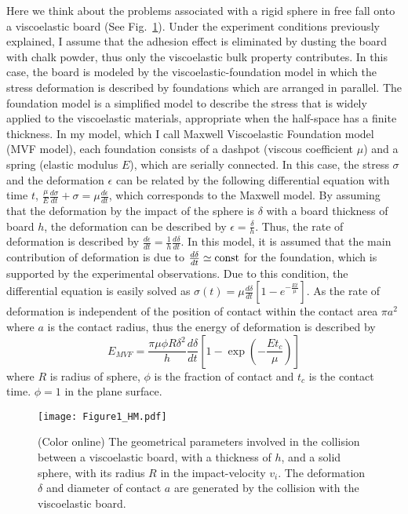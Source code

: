 \documentclass[default,iicol,10pt]{sn-jnl}%
\theoremstyle{thmstyleone}%
\theoremstyle{thmstyletwo}%
\theoremstyle{thmstylethree}%
\begin{document}
Here we think about the problems associated with a rigid sphere in free fall onto a viscoelastic board (See Fig.~\ref{fig:F1}). Under the experiment conditions previously explained, I assume that the adhesion effect is eliminated by dusting the board with chalk powder, thus only the viscoelastic bulk property contributes. In this case, the board is modeled by the viscoelastic-foundation model in which the stress deformation is described by foundations which are arranged in parallel\cite{Foundation}. The foundation model is a simplified model to describe the stress that is widely applied to the viscoelastic materials, appropriate when the half-space has a finite thickness. In my model, which I call Maxwell Viscoelastic Foundation model (MVF model), each foundation consists of a dashpot (viscous coefficient $\mu$) and a spring (elastic modulus $E$), which are serially connected. In this case, the stress $\sigma$ and the deformation $\epsilon$ can be related by the following differential equation with time $t$, $\frac{\mu}{E}\frac{d \sigma}{dt} + \sigma = \mu \frac{d \epsilon}{dt}$, which corresponds to the Maxwell model. By assuming that the deformation by the impact of the sphere is $\delta$ with a board thickness of board $h$, the deformation can be described by $\epsilon = \frac{\delta}{h}$. Thus, the rate of deformation is described by $\frac{d \epsilon}{dt} = \frac{1}{h}\frac{d \delta}{dt}$. In this model, it is assumed that the main contribution of deformation is due to $\frac{d \delta}{dt} \simeq {\rm const}$ for the foundation, which is supported by the experimental observations\cite{SMD}. Due to this condition, the differential equation is easily solved as $\sigma\left(t \right) = \mu \frac{d \delta}{dt}\left[1 - e^{-\frac{Et}{\mu}} \right]$. As the rate of deformation is independent of the position of contact within the contact area $\pi a^2$ where $a$ is the contact radius, thus the energy of deformation is described by 
\begin{equation}
E_{MVF} = \frac{\pi \mu \phi R \delta^2 }{h}\frac{d \delta}{dt} \left[ 1 - \exp \left(-\frac{E t_c}{ \mu} \right) \right] 
\label{eq:E1} 
\end{equation} 
where $R$ is radius of sphere, $\phi$ is the fraction of contact and $t_c$ is the contact time. $\phi = 1$ in the plane surface.
%
\begin{figure}[h] 
\begin{center} 
\texttt{[image: Figure1\_HM.pdf]}
\caption{(Color online) The geometrical parameters involved in the collision between a viscoelastic board, with a thickness of $h$, and a solid sphere, with its radius $R$ in the impact-velocity $v_i$. The deformation $\delta$  and diameter of contact $a$ are generated by the collision with the viscoelastic board.}
\label{fig:F1}
\end{center}
\end{figure} 
%
\end{document}
